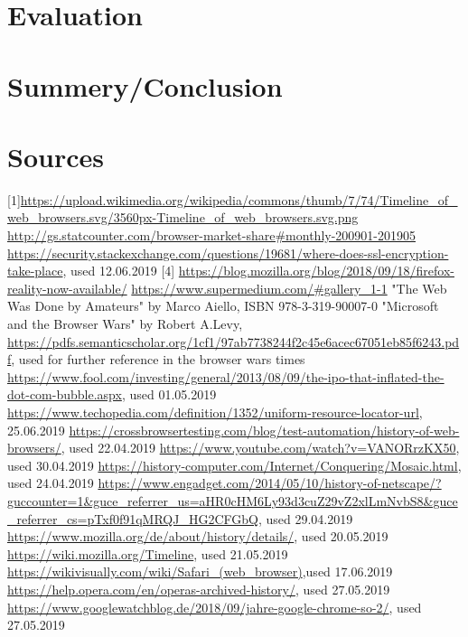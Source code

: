 \documentclass[runningheads]{llncs}
\begin{document}
	\section{Evaluation}

	\section{Summery/Conclusion}
	\section{Sources}
	[1]\url{https://upload.wikimedia.org/wikipedia/commons/thumb/7/74/Timeline_of_web_browsers.svg/3560px-Timeline_of_web_browsers.svg.png}
	\newline
	[2] \url{http://gs.statcounter.com/browser-market-share#monthly-200901-201905}
	\newline
	[3]\url{https://security.stackexchange.com/questions/19681/where-does-ssl-encryption-take-place}, used 12.06.2019
	[4]
	\url{https://blog.mozilla.org/blog/2018/09/18/firefox-reality-now-available/}
	\newline
	[5]
	\url{https://www.supermedium.com/#gallery_1-1}
	\newline
	[6] "The Web Was Done by Amateurs" by Marco Aiello, ISBN 978-3-319-90007-0 \newline
	[7] "Microsoft and the Browser Wars" by Robert A.Levy, \url{https://pdfs.semanticscholar.org/1cf1/97ab7738244f2c45e6acec67051eb85f6243.pdf}, used for further reference in the browser wars times
	\newline
	[8] \url{https://www.fool.com/investing/general/2013/08/09/the-ipo-that-inflated-the-dot-com-bubble.aspx}, used 01.05.2019
	\newline
	[9] \url{https://www.techopedia.com/definition/1352/uniform-resource-locator-url}, 25.06.2019
	\newline
	[10] \url{https://crossbrowsertesting.com/blog/test-automation/history-of-web-browsers/}, used 22.04.2019
	\newline
	[11] \url{https://www.youtube.com/watch?v=VANORrzKX50}, used 30.04.2019
	\newline
	[12] \url{
		https://history-computer.com/Internet/Conquering/Mosaic.html}, used 24.04.2019
	\newline
	[13] \url{
		https://www.engadget.com/2014/05/10/history-of-netscape/?guccounter=1&guce_referrer_us=aHR0cHM6Ly93d3cuZ29vZ2xlLmNvbS8&guce_referrer_cs=pTxf0f91qMRQJ_HG2CFGbQ}, used 29.04.2019
	\newline
	[14] \url{
		https://www.mozilla.org/de/about/history/details/}, used 20.05.2019
	\newline
	[15] \url{https://wiki.mozilla.org/Timeline}, used 21.05.2019
	\newline
	[16] \url{
		https://wikivisually.com/wiki/Safari_(web_browser)},used 17.06.2019
	\newline
	[17] \url{
		https://help.opera.com/en/operas-archived-history/}, used 27.05.2019
	\newline
	[18] \url{
		https://www.googlewatchblog.de/2018/09/jahre-google-chrome-so-2/}, used 27.05.2019
	\newline
	
	
\end{document}
